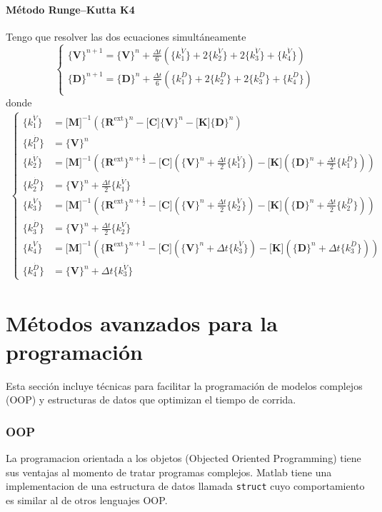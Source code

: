 \documentclass[11pt, a4paper,titlepage]{article}
\newcommand{\rmfont}[1]{{\fontfamily{ptm}\selectfont%
#1}}
\newcommand{\Matlab}{\rmfont{\sc Matlab}}
\newcommand{\Mme}[1]{\boldsymbol{[}\mathbf{#1} \boldsymbol{]}}
\newcommand{\Cme}[1]{\boldsymbol{\{ }\mathbf{#1} \boldsymbol{\}} }
\newcommand{\Cmen}[1]{\boldsymbol{\{ }#1 \boldsymbol{\}} }
\newcommand{\kuD}{\Cmen{k_1^{\dot{D}}}}
\newcommand{\kdD}{\Cmen{k_2^{\dot{D}}}}
\newcommand{\ktD}{\Cmen{k_3^{\dot{D}}}}
\newcommand{\kcD}{\Cmen{k_4^{\dot{D}}}}
\newcommand{\kuV}{\Cmen{k_1^{\dot{V}}}}
\newcommand{\kdV}{\Cmen{k_2^{\dot{V}}}}
\newcommand{\ktV}{\Cmen{k_3^{\dot{V}}}}
\newcommand{\kcV}{\Cmen{k_4^{\dot{V}}}}
\newcommand{\MK}{\Mme{K}}
\newcommand{\MC}{\Mme{C}}
\let\oldpart\part
\renewcommand{\part}[1]{\clearpage \oldpart{#1}}
\begin{document}
\subsection*{Método Runge--Kutta K4}
Tengo que resolver las dos ecuaciones simultáneamente
\[
\begin{cases}
	\Cme{V}^{n+1}=\Cme{V}^n + \frac{\Delta t}{6} \left( \kuV + 2\kdV + 2\ktV + \kcV \right) \\
	\Cme{D}^{n+1}=\Cme{D}^n + \frac{\Delta t}{6} \left( \kuD + 2\kdD + 2\ktD + \kcD \right) \\
\end{cases}
\]
donde 
\begin{align*}
	\begin{cases}
	\kuV &= \Mme{M}^{-1} \left( \Cme{R^{\mathrm{ext}}}^n - \MC \Cme{V}^n - \MK \Cme{D}^n  \right) \\
	\kuD &= \Cme{V}^n \\\hline
	\kdV &= \Mme{M}^{-1} \left( \Cme{R^{\mathrm{ext}}}^{n+\frac{1}{2}} - \MC \left(\Cme{V}^n + \frac{\Delta t}{2} \kuV \right) - \MK \left( \Cme{D}^n + \frac{\Delta t}{2} \kuD \right)  \right) \\
	\kdD &= \Cme{V}^n + \frac{\Delta t}{2} \kuV \\	\hline
	\ktV &= \Mme{M}^{-1} \left( \Cme{R^{\mathrm{ext}}}^{n+\frac{1}{2}} - \MC \left(\Cme{V}^n + \frac{\Delta t}{2} \kdV \right) - \MK \left( \Cme{D}^n + \frac{\Delta t}{2} \kdD \right)  \right) \\
	\ktD &= \Cme{V}^n + \frac{\Delta t}{2} \kdV \\	\hline
	\kcV &= \Mme{M}^{-1} \left( \Cme{R^{\mathrm{ext}}}^{n+1} - \MC \left(\Cme{V}^n + \Delta t \ktV \right) - \MK \left( \Cme{D}^n + \Delta t \ktD \right)  \right) \\
	\kcD &= \Cme{V}^n + \Delta t \ktV
	\end{cases}
\end{align*}

\part{Métodos avanzados para la programación}
Esta sección incluye técnicas para facilitar la programación de modelos complejos (OOP) y estructuras de datos que optimizan el tiempo de corrida.

\section{OOP}
La programacion orientada a los objetos (Objected Oriented Programming) tiene sus ventajas al momento de tratar programas complejos. \Matlab{} tiene una implementacion de una estructura de datos llamada \verb|struct| cuyo comportamiento es similar al de otros lenguajes OOP. 
\end{document}
